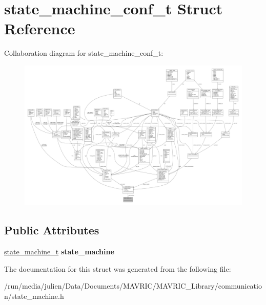 \hypertarget{structstate__machine__conf__t}{\section{state\+\_\+machine\+\_\+conf\+\_\+t Struct Reference}
\label{structstate__machine__conf__t}
}


Collaboration diagram for state\+\_\+machine\+\_\+conf\+\_\+t\+:
\nopagebreak
\begin{figure}[H]
\begin{center}
\leavevmode
\includegraphics[width=350pt]{structstate__machine__conf__t__coll__graph}
\end{center}
\end{figure}
\subsection*{Public Attributes}
\begin{DoxyCompactItemize}
\item 
\hypertarget{structstate__machine__conf__t_a8034c642b864decdd676e526d3a50bcd}{\hyperlink{structstate__machine__t}{state\+\_\+machine\+\_\+t} {\bfseries state\+\_\+machine}}\label{structstate__machine__conf__t_a8034c642b864decdd676e526d3a50bcd}

\end{DoxyCompactItemize}


The documentation for this struct was generated from the following file\+:\begin{DoxyCompactItemize}
\item 
/run/media/julien/\+Data/\+Documents/\+M\+A\+V\+R\+I\+C/\+M\+A\+V\+R\+I\+C\+\_\+\+Library/communication/state\+\_\+machine.\+h\end{DoxyCompactItemize}
